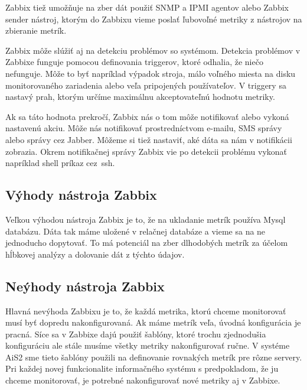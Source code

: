 \documentclass[a4paper, upjsfrontpage, disablespecwarning, thesismargins, thesislinespacing]{rnthesis}
\begin{document}
Zabbix tiež umožňuje na zber dát použiť SNMP a IPMI agentov alebo Zabbix sender nástroj, ktorým do Zabbixu vieme poslať ľubovoľné metriky z nástrojov na zbieranie metrík.

Zabbix môže slúžiť aj na detekciu problémov so systémom.
Detekcia problémov v Zabbixe funguje pomocou definovania triggerov, ktoré odhalia, že niečo nefunguje.
Môže to byť napríklad výpadok stroja, málo voľného miesta na disku monitorovaného zariadenia alebo veľa pripojených používateľov.
V triggery sa nastavý prah, ktorým určíme maximálnu akceptovateľnú hodnotu metriky.

Ak sa táto hodnota prekročí, Zabbix nás o tom môže notifikovať alebo vykoná nastavenú akciu.
Môže nás notifikovať prostredníctvom e-mailu, SMS správy alebo správy cez Jabber.
Môžeme si tiež nastaviť, aké dáta sa nám v notifikácii zobrazia.
Okrem notifikačnej správy Zabbix vie po detekcii problému vykonať napríklad shell príkaz cez~ssh.

\subsection{Výhody nástroja Zabbix}

Veľkou výhodou nástroja Zabbix je to, že na ukladanie metrík používa Mysql databázu.
Dáta tak máme uložené v relačnej databáze a vieme sa na ne jednoducho dopytovať.
To má potenciál na zber dlhodobých metrík za účelom hĺbkovej analýzy a dolovanie dát z týchto údajov.


\subsection{Neýhody nástroja Zabbix}

Hlavná nevýhoda Zabbixu je to, že každá metrika, ktorú chceme monitorovať musí byť dopredu nakonfigurovaná.
Ak máme metrík veľa, úvodná konfigurácia je pracná.
Síce sa v Zabbixe dajú použiť šablóny, ktoré trochu zjednodušia konfiguráciu ale stále musíme všetky metriky nakonfigurovať ručne.
V systéme AiS2 sme tieto šablóny použili na definovanie rovnakých metrík pre rôzne servery.
Pri každej novej funkcionalite informačného systému s predpokladom, že ju chceme monitorovať, je potrebné nakonfigurovať nové metriky aj v Zabbixe.
\end{document}
